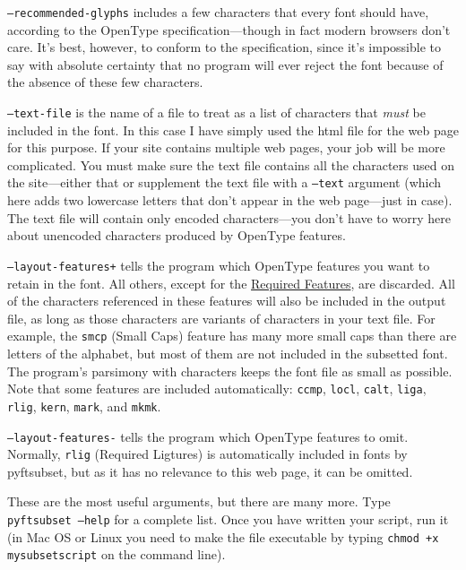 \documentclass[12pt,letterpaper,openany]{book}
\newcommand\textSourceText[1]{{\color{GGOrange}\texttt{#1}}}
\newcounter{Feature}
\begin{document}
\texttt{--recommended-glyphs} includes a few characters that
every font should have, according to the OpenType specification---though in
fact modern browsers don't care. It's best, however, to conform to the specification,
since it's impossible to say with absolute certainty that no program will
ever reject the font
because of the absence of these few characters.

\texttt{--text-file} is the name of a file to treat as a list of characters
that \textit{must} be included in the font. In this case I have simply used
the html file for the web page for this purpose. If your site contains
multiple web pages, your job will be more complicated. You must make sure the
text file contains all the characters used on the site---either that or
supplement the text file with a \texttt{--text} argument (which here adds
two lowercase letters that don't appear in the web page---just in case).
The text file will
contain only encoded characters—you don't have to worry here about unencoded
characters produced by OpenType features.

\texttt{--layout-features+} tells the program which OpenType features you
want to retain in the font. All others, except for the
\hyperlink{req}{Required Features}, are discarded. All of the characters
referenced in these features will also be included in the output file, as long
as those characters are variants of characters in your text file. For example,
the \textSourceText{smcp} (Small Caps) feature has many more small caps than there are letters
of the alphabet, but most of them are not included in the subsetted font. The
program's parsimony with characters keeps the font file as small as possible.
Note that some features are included automatically: \textSourceText{ccmp},
\textSourceText{locl}, \textSourceText{calt}, \textSourceText{liga}, \textSourceText{rlig},
\textSourceText{kern}, \textSourceText{mark}, and \textSourceText{mkmk}.


\texttt{--layout-features-} tells the program which OpenType features to omit.
Normally, \textSourceText{rlig} (Required Ligtures) is automatically
included in fonts by pyftsubset, but as it has no relevance to this web page,
it can be omitted.

These are the most useful arguments, but there are many more. Type
\texttt{pyftsubset --help} for a complete list. Once you have written your
script, run it (in Mac OS or Linux you need to make the file executable
by typing \texttt{chmod +x mysubsetscript} on the command line).
\end{document}
